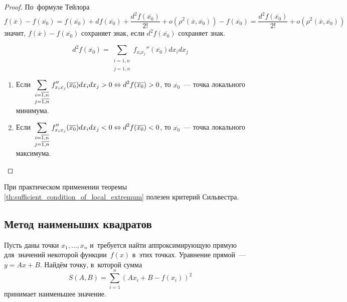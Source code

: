 \begin{proof}
По~формуле Тейлора
\begin{equation*}
f(\overline x) - f(\overline{x_0}) =
f(\overline{x_0}) + df(\overline{x_0}) + \frac{d^2 f(\overline{x_0})}{2!} + o(\rho^2(\overline x, \overline{x_0})) - f(\overline{x_0}) =
\frac{d^2 f(\overline{x_0})}{2!} + o(\rho^2(\overline x, \overline{x_0}))
\end{equation*}
значит, $f(\overline x) - f(\overline{x_0})$ сохраняет знак, если $d^2 f(\overline{x_0})$ сохраняет знак.
	
\begin{equation*}
d^2 f(\overline{x_0}) = \sum_{
\begin{smallmatrix}
i = \overline{1, n} \\
j = \overline{1, n}
\end{smallmatrix}
} f_{x_i x_j}''(\overline{x_0}) dx_i dx_j
\end{equation*}
	
\begin{enumerate}
	\item Если $\displaystyle \sum_{
	\begin{smallmatrix}
	i = \overline{1, n} \\
	j = \overline{1, n}
	\end{smallmatrix}
	} f_{x_i x_j}''(\overline{x_0}) dx_i dx_j > 0 \opbr\Leftrightarrow
	d^2 f(\overline{x_0}) > 0$, то $\overline{x_0}$~--- точка локального минимума.
	\item Если $\displaystyle \sum_{
	\begin{smallmatrix}
	i = \overline{1, n} \\
	j = \overline{1, n}
	\end{smallmatrix}
	} f_{x_i x_j}''(\overline{x_0}) dx_i dx_j < 0 \opbr\Leftrightarrow
	d^2 f(\overline{x_0}) < 0$, то $\overline{x_0}$~--- точка локального максимума.
\end{enumerate}
\end{proof}
	
При практическом применении теоремы \ref{th:sufficient_condition_of_local_extremum} полезен критерий Сильвестра.
	
\subsection{Метод наименьших квадратов}
Пусть даны точки $x_1, \ldots, x_n$ и~требуется найти аппроксимирующую прямую для~значений некоторой функции~$f(x)$ в~этих точках.
Уравнение прямой~--- $y = Ax + B$.
Найдём точку, в~которой сумма
\begin{equation*}
S(A, B) = \sum_{i=1}^n (A x_i + B - f(x_i))^2
\end{equation*}
принимает наименьшее значение.
	
